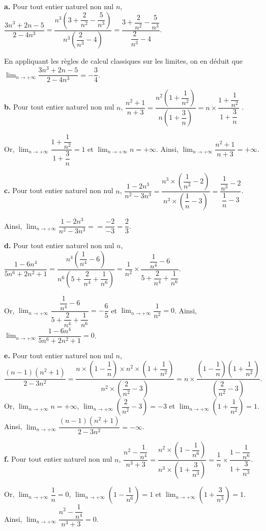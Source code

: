 \documentclass[11pt,fleqn]{book} %
\begin{document}
\begin{solution} \textbf{a.} Pour tout entier naturel non nul $n$, $\dfrac{3n^3+2n-5}{2-4n^3}=\dfrac{n^3\left(3+\dfrac{2}{n^2}-\dfrac{5}{n^3}\right)}{n^3\left(\dfrac{2}{n^3}-4\right)}=\dfrac{3+\dfrac{2}{n^2}-\dfrac{5}{n^3}}{\dfrac{2}{n^3}-4}$.

En appliquant les règles de calcul classiques sur les limites, on en déduit que $\displaystyle \lim_{n \to +\infty} \dfrac{3n^3+2n-5}{2-4n^3} = -\dfrac{3}{4}$.

\textbf{b.} Pour tout entier naturel non nul  $n$, $\dfrac{n^2+1}{n+3}=\dfrac{n^2\left(1+\dfrac{1}{n^2}\right)}{n\left(1+\dfrac{3}{n}\right)}=n\times\dfrac{1+\dfrac{1}{n^2}}{1+\dfrac{3}{n}}$ .

Or, $\displaystyle \lim_{n \to +\infty} \dfrac{1+\dfrac{1}{n^2}}{1+\dfrac{3}{n}}=1$ et $\displaystyle \lim_{n \to +\infty} n = +\infty$. Ainsi, $\displaystyle \lim_{n \to +\infty} \dfrac{n^2+1}{n+3} = +\infty$.

\textbf{c.} Pour tout entier naturel non nul $n$, $\dfrac{1-2n^3}{n^2-3n^3}=\dfrac{n^3\times \left(\dfrac{1}{n^3}-2\right)}{n^3\times\left(\dfrac{1}{n}-3\right)}=\dfrac{\dfrac{1}{n^3}-2}{\dfrac{1}{n}-3}$.

 Ainsi, $\displaystyle \lim_{n \to +\infty}\dfrac{1-2n^3}{n^2-3n^3}==\dfrac{-2}{-3}=\dfrac{2}{3}$.

\textbf{d.} Pour tout entier naturel non nul $n$, $\dfrac{1-6n^4}{5n^6+2n^2+1}=\dfrac{n^4\left(\dfrac{1}{n^4}-6\right)}{n^6\left(5+\dfrac{2}{n^4}+\dfrac{1}{n^6}\right)}=\dfrac{1}{n^2} \times \dfrac{\dfrac{1}{n^4}-6}{5+\dfrac{2}{n^4}+\dfrac{1}{n^6}}$.

Or, $\displaystyle \lim_{n \to +\infty} \dfrac{\dfrac{1}{n^4}-6}{5+\dfrac{2}{n^4}+\dfrac{1}{n^6}} = -\dfrac{6}{5}$ et $\displaystyle \lim_{n \to +\infty} \dfrac{1}{n^2}=0$. Ainsi, $\displaystyle \lim_{n \to +\infty}\dfrac{1-6n^4}{5n^6+2n^2+1}=0$.

\textbf{e.} Pour tout entier naturel non nul $n$, \[\dfrac{(n-1)(n^2+1)}{2-3n^2}=\dfrac{n \times \left(1-\dfrac{1}{n}\right) \times n^2 \times \left(1+\dfrac{1}{n^2}\right)}{n^2\times \left(\dfrac{2}{n^2}-3\right)}=n \times \dfrac{ \left(1-\dfrac{1}{n}\right) \left(1+\dfrac{1}{n^2}\right)}{\left(\dfrac{2}{n^2}-3\right)}.\]
Or, $\displaystyle \lim_{n \to +\infty}n=+\infty$, $\displaystyle \lim_{n \to +\infty}\left(\dfrac{2}{n^2}-3\right)=-3$ et $\displaystyle \lim_{n \to +\infty}\left(1+\dfrac{1}{n^2}\right)=1$. \\Ainsi, $\displaystyle \lim_{n \to +\infty}\dfrac{(n-1)(n^2+1)}{2-3n^2}=-\infty$.

\textbf{f.} Pour tout entier naturel non nul $n$, $\dfrac{n^2-\dfrac{1}{n^4}}{n^3+3}=\dfrac{n^2 \times \left(1-\dfrac{1}{n^6}\right)}{n^3\times\left(1+\dfrac{3}{n^3}\right)}=\dfrac{1}{n} \times \dfrac{1-\dfrac{1}{n^6}}{1+\dfrac{3}{n^3}}$.

Or, $\displaystyle \lim_{n \to +\infty} \dfrac{1}{n}=0$, $\displaystyle \lim_{n \to +\infty}\left(1-\dfrac{1}{n^6}\right)=1$ et $\displaystyle \lim_{n \to +\infty}\left(1+\dfrac{3}{n^3}\right)=1$. Ainsi, $\displaystyle \lim_{n \to +\infty}\dfrac{n^2-\dfrac{1}{n^4}}{n^3+3}=0$.\end{solution}
\end{document}
